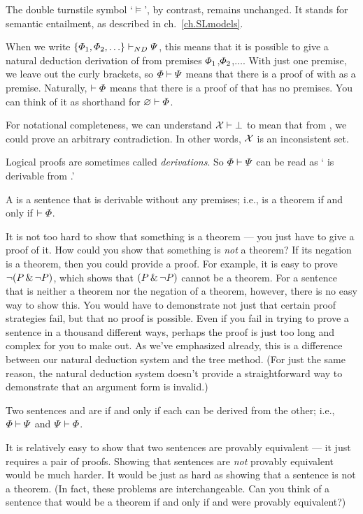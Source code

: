 The {double turnstile} symbol `$\models$', by contrast, remains unchanged. It stands for semantic entailment, as described in ch.~\ref{ch.SLmodels}.

When we write $\{\varPhi{}_1,\varPhi{}_2,\ldots\}\vdash_{ND}\varPsi{}$, this means that it is possible to give a natural deduction derivation of \metaB{} from premises $\varPhi{}_1$,$\varPhi{}_2$,$\ldots$. With just one premise, we leave out the curly brackets, so $\varPhi{}\vdash\varPsi{}$ means that there is a proof of \metaB{} with \metaA{} as a premise. Naturally, $\vdash\varPhi{}$ means that there is a proof of \metaA{} that has no premises. You can think of it as shorthand for $\varnothing\vdash\varPhi{}$. 

For notational completeness, we can understand $\mathcal{X}{}\vdash\bot$ to mean that from \metaSetX{}, we could prove an arbitrary contradiction. In other words, $\mathcal{X}{}$ is an inconsistent set.

Logical proofs are sometimes called \emph{derivations}. So $\varPhi{}\vdash\varPsi{}$ can be read as `\metaB{} is derivable from \metaA{}.'

A  is a sentence that is derivable without any premises; i.e., \metaA{} is a theorem if and only if $\vdash\varPhi{}$.

It is not too hard to show that something is a theorem --- you just have to give a proof of it. How could you show that something is \emph{not} a theorem? If its negation is a theorem, then you could provide a proof. For example, it is easy to prove $\neg(P \,\&\, \neg P)$, which shows that $(P \,\&\, \neg P)$ cannot be a theorem. For a sentence that is neither a theorem nor the negation of a theorem, however, there is no easy way to show this. You would have to demonstrate not just that certain proof strategies fail, but that no proof is possible. Even if you fail in trying to prove a sentence in a thousand different ways, perhaps the proof is just too long and complex for you to make out. As we've emphasized already, this is a difference between our natural deduction system and the tree method. (For just the same reason, the natural deduction system doesn't provide a straightforward way to demonstrate that an argument form is invalid.)

Two sentences \metaA{} and \metaB{} are  if and only if each can be derived from the other; i.e., $\varPhi{}\vdash\varPsi{}$ and $\varPsi{}\vdash\varPhi{}$.

It is relatively easy to show that two sentences are provably equivalent --- it just requires a pair of proofs. Showing that sentences are \emph{not} provably equivalent would be much harder. It would be just as hard as showing that a sentence is not a theorem. (In fact, these problems are interchangeable. Can you think of a sentence that would be a theorem if and only if \metaA{} and \metaB{} were provably equivalent?)

